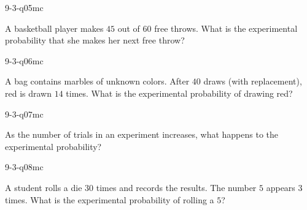 \begin{practiceQuestion}{9-3-q05}{mc}
\begin{questionText}
A basketball player makes $45$ out of $60$ free throws. What is the experimental probability that she makes her next free throw?
\end{questionText}
\end{practiceQuestion}

\begin{practiceQuestion}{9-3-q06}{mc}
\begin{questionText}
A bag contains marbles of unknown colors. After $40$ draws (with replacement), red is drawn $14$ times. What is the experimental probability of drawing red?
\end{questionText}
\end{practiceQuestion}

\begin{practiceQuestion}{9-3-q07}{mc}
\begin{questionText}
As the number of trials in an experiment increases, what happens to the experimental probability?
\end{questionText}
\end{practiceQuestion}

\begin{practiceQuestion}{9-3-q08}{mc}
\begin{questionText}
A student rolls a die $30$ times and records the results. The number $5$ appears $3$ times. What is the experimental probability of rolling a $5$?
\end{questionText}
\end{practiceQuestion}

